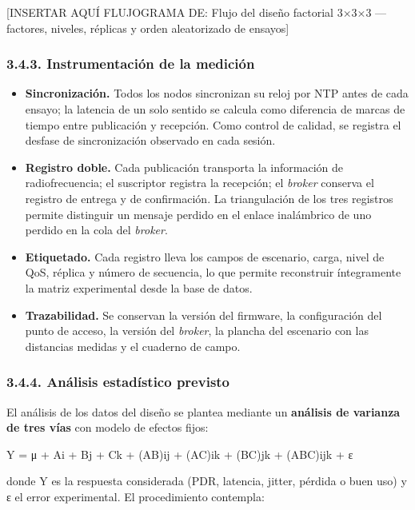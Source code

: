 \documentclass[
  12pt,
]{article}
\providecommand{\tightlist}{%
  \setlength{\itemsep}{0pt}\setlength{\parskip}{0pt}}
\begin{document}
{[}INSERTAR AQUÍ FLUJOGRAMA DE: Flujo del diseño factorial 3×3×3 —
factores, niveles, réplicas y orden aleatorizado de ensayos{]}

\subsubsection{3.4.3. Instrumentación de la
medición}\label{instrumentaciuxf3n-de-la-mediciuxf3n}

\begin{itemize}
\tightlist
\item
  \textbf{Sincronización.} Todos los nodos sincronizan su reloj por NTP
  antes de cada ensayo; la latencia de un solo sentido se calcula como
  diferencia de marcas de tiempo entre publicación y recepción. Como
  control de calidad, se registra el desfase de sincronización observado
  en cada sesión.
\item
  \textbf{Registro doble.} Cada publicación transporta la información de
  radiofrecuencia; el suscriptor registra la recepción; el \emph{broker}
  conserva el registro de entrega y de confirmación. La triangulación de
  los tres registros permite distinguir un mensaje perdido en el enlace
  inalámbrico de uno perdido en la cola del \emph{broker}.
\item
  \textbf{Etiquetado.} Cada registro lleva los campos de escenario,
  carga, nivel de QoS, réplica y número de secuencia, lo que permite
  reconstruir íntegramente la matriz experimental desde la base de
  datos.
\item
  \textbf{Trazabilidad.} Se conservan la versión del firmware, la
  configuración del punto de acceso, la versión del \emph{broker}, la
  plancha del escenario con las distancias medidas y el cuaderno de
  campo.
\end{itemize}

\subsubsection{3.4.4. Análisis estadístico
previsto}\label{anuxe1lisis-estaduxedstico-previsto}

El análisis de los datos del diseño se plantea mediante un
\textbf{análisis de varianza de tres vías} con modelo de efectos fijos:

Y = μ + Ai + Bj + Ck + (AB)ij + (AC)ik + (BC)jk + (ABC)ijk + ε

donde Y es la respuesta considerada (PDR, latencia, jitter, pérdida o
buen uso) y ε el error experimental. El procedimiento contempla:
\end{document}
